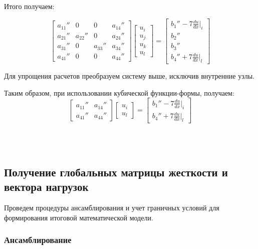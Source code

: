 Итого получаем:

$$ \begin{bmatrix}
a_{11}''     &  0  & 0  &  a_{14}''\\
a_{21}''     &  a_{22}''  & 0  &  a_{24}''\\
a_{31}''     &  0  &  a_{33}'' &  a_{34}''\\
a_{41}''    &  0  & 0  &  a_{44}''
\end{bmatrix}
\begin{bmatrix}
u_i \\
u_j \\
u_k\\
u_l
\end{bmatrix} =
\begin{bmatrix}
b_1'' ^{}   -7  \frac{du}{dx}|_i \\
b_2''\\
b_3''\\
b_4''   +7  \frac{du}{dx}|_l
\end{bmatrix}$$

Для упрощения расчетов преобразуем систему выше, исключив внутренние узлы.


Таким образом, при использовании кубической функции-формы,  получаем:
$$ \begin{bmatrix}
a_{11}''     &   a_{14}''\\
a_{41}''     &    a_{44}''
\end{bmatrix}
\begin{bmatrix}
u_i \\
u_l
\end{bmatrix} =
\begin{bmatrix}
b_{1}'' ^{}   -7  \frac{du}{dx}|_i \\
b_4''   +7  \frac{du}{dx}|_l
\end{bmatrix}$$

~\\
~\\


\subsection{Получение глобальных матрицы жесткости и вектора нагрузок}

Проведем процедуры ансамблирования и учет граничных условий для формирования итоговой математической модели.

\subsubsection{Ансамблирование}

